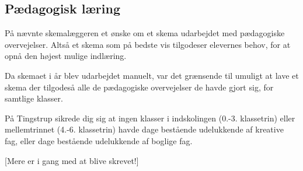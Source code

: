 \subsection{Pædagogisk læring}
\label{paedagogisk_laering}
På \school nævnte skemalæggeren et ønske om et skema udarbejdet med pædagogiske overvejelser. Altså et skema som på bedste vis tilgodeser elevernes behov, for at opnå den højest mulige indlæring.

Da skemaet i år blev udarbejdet manuelt, var det grænsende til umuligt at lave et skema der tilgodeså alle de pædagogiske overvejelser de havde gjort sig, for samtlige klasser.

På Tingstrup sikrede dig sig at ingen klasser i indskolingen (0.-3. klassetrin) eller mellemtrinnet (4.-6. klassetrin) havde dage bestående udelukkende af kreative fag, eller dage bestående udelukkende af boglige fag. 

[Mere er i gang med at blive skrevet!]